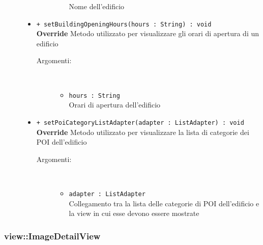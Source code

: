 \documentclass[../DefinizioneDiProdotto.tex]{subfiles}
\begin{document}
\begin{description}
\begin{itemize}
\begin{description}
\begin{itemize}
Nome dell'edificio\end{itemize}
\end{description}
\item \texttt{+ setBuildingOpeningHours(hours : String) : void}\\
\textbf{Override} Metodo utilizzato per visualizzare gli orari di apertura di un edificio
 \begin{description}
\item[Argomenti:] \
\begin{itemize}
\item \texttt{hours : String}\\
Orari di apertura dell'edificio\end{itemize}
\end{description}
\item \texttt{+ setPoiCategoryListAdapter(adapter : ListAdapter) : void}\\
\textbf{Override} Metodo utilizzato per visualizzare la lista di categorie dei POI dell'edificio
 \begin{description}
\item[Argomenti:] \
\begin{itemize}
\item \texttt{adapter : ListAdapter}\\
Collegamento tra la lista delle categorie di POI dell'edificio e la view in cui esse devono essere mostrate\end{itemize}
\end{description}
\end{itemize}
\end{description}

\subsubsection{view::ImageDetailView}
\end{document}
